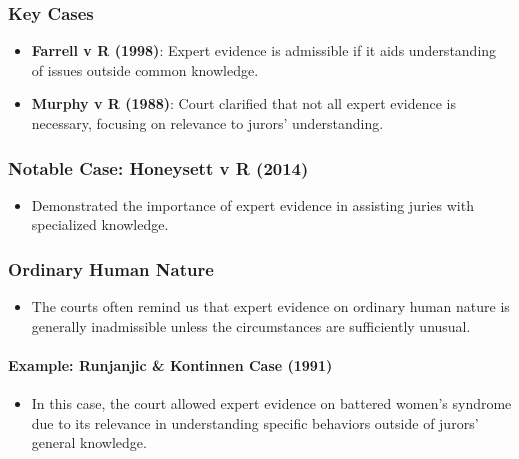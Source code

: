\subsubsection{Key Cases}\label{key-cases}

\begin{itemize}
\tightlist
\item
  \textbf{Farrell v R (1998)}: Expert evidence is admissible if it aids
  understanding of issues outside common knowledge.
\item
  \textbf{Murphy v R (1988)}: Court clarified that not all expert
  evidence is necessary, focusing on relevance to jurors' understanding.
\end{itemize}

\subsubsection{Notable Case: Honeysett v R
(2014)}\label{notable-case-honeysett-v-r-2014}

\begin{itemize}
\tightlist
\item
  Demonstrated the importance of expert evidence in assisting juries
  with specialized knowledge.
\end{itemize}

\subsubsection{Ordinary Human Nature}\label{ordinary-human-nature}

\begin{itemize}
\tightlist
\item
  The courts often remind us that expert evidence on ordinary human
  nature is generally inadmissible unless the circumstances are
  sufficiently unusual.
\end{itemize}

\paragraph{Example: Runjanjic \& Kontinnen Case
(1991)}\label{example-runjanjic-kontinnen-case-1991}

\begin{itemize}
\tightlist
\item
  In this case, the court allowed expert evidence on battered women's
  syndrome due to its relevance in understanding specific behaviors
  outside of jurors' general knowledge.
\end{itemize}

